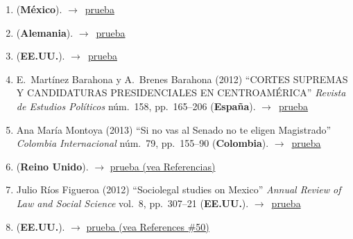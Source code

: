 \documentclass[12 pt, letter]{article}
\newenvironment{CitasMiTrabajo}{
    \begin{footnotesize}
    \begin{enumerate}[label={\footnotesize\emph{cita~\arabic*}},ref=\arabic*] %
        \setlength{\itemsep}{.1\itemsep}
        \setlength{\parskip}{.1\parskip}
    }{\end{enumerate}\end{footnotesize}}
\begin{document}
\begin{CitasMiTrabajo}
          \item {} (\textbf{M\'exico}). $\rightarrow$~\href{https://www.eljuegodelacorte.nexos.com.mx/?p=5970}{prueba}

          \item {} (\textbf{Alemania}). $\rightarrow$~\href{https://www.degruyter.com/view/j/rle.2017.13.issue-1/rle-2015-0040/rle-2015-0040.xml}{prueba}
          
          \item {} (\textbf{EE.UU.}). $\rightarrow$~\href{https://www.jstor.org/stable/pdf/41683128.pdf?casa_token=m2CeIBwwgBQAAAAA:2nu3eD9KAOHQXGIDZA7OGdZVX5ror3lRI-jco2N37zxHQhJnR0LFvNl_KERwlII7qazgsN3TT6AdMNo4Ipp9nVu_QAg5loT0-stZNmZYV1jWC6MUKFA}{prueba}
          
        \item E.~Mart\'inez Barahona y A.~Brenes Barahona (2012) ``CORTES SUPREMAS Y CANDIDATURAS PRESIDENCIALES EN CENTROAM\'ERICA'' \emph{Revista de Estudios Pol\'iticos} n\'um.~158, pp.~165--206 (\textbf{Espa\~na}). $\rightarrow$~\href{https://github.com/emagar/cv/blob/master/citasMiTrab/sanchMagalMagarChapter/mtnzBarahonaCortesCandPres2012rep.pdf}{prueba}

        \item Ana Mar\'ia Montoya (2013) ``Si no vas al Senado no te eligen Magistrado'' \emph{Colombia Internacional} n\'um.~79, pp.~155--90 (\textbf{Colombia}). $\rightarrow$~\href{https://github.com/emagar/cv/blob/master/citasMiTrab/sanchMagalMagarChapter/montoya2013.pdf}{prueba}

        \item {} (\textbf{Reino Unido}). $\rightarrow$ \href{https://www.cambridge.org/core/journals/british-journal-of-political-science/article/judicial-instability-and-endogenous-constitutional-change-lessons-from-latin-america/60789D239F907B3584DA3DB1D4EC431D}{prueba (vea Referencias)}

        \item Julio R\'ios Figueroa (2012) ``Sociolegal studies on Mexico'' \emph{Annual Review of Law and Social Science} vol.~8, pp.~307--21 (\textbf{EE.UU.}). $\rightarrow$~\href{https://github.com/emagar/cv/blob/master/citasMiTrab/sanchMagalMagarChapter/riosSociolegalMex2012.pdf}{prueba}

        \item {} (\textbf{EE.UU.}). $\rightarrow$ \href{https://www.tandfonline.com/doi/ref/10.1080/13510347.2017.1304379}{prueba (vea References \#50)}

        \label{ncites:sanchez.magaloni.magar.2011} %

        
        \end{CitasMiTrabajo}
\end{document}
